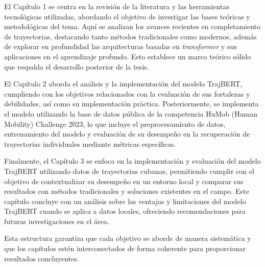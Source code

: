 El Capítulo 1 se centra en la revisión de la literatura y las herramientas tecnológicas utilizadas, abordando el objetivo de investigar las bases teóricas y metodológicas del tema. Aquí se analizan los avances recientes en completamiento de trayectorias, destacando tanto métodos tradicionales como modernos, además de explorar en profundidad las arquitecturas basadas en \textit{transformer} y sus aplicaciones en el aprendizaje profundo. Esto establece un marco teórico sólido que respalda el desarrollo posterior de la tesis.

El Capítulo 2 aborda el análisis y la implementación del modelo TrajBERT, cumpliendo con los objetivos relacionados con la evaluación de sus fortalezas y debilidades, así como su implementación práctica. Posteriormente, se implementa el modelo utilizando la base de datos pública de la competencia HuMob (Human Mobility) Challenge 2023, lo que incluye el preprocesamiento de datos, entrenamiento del modelo y evaluación de su desempeño en la recuperación de trayectorias individuales mediante métricas específicas.

Finalmente, el Capítulo 3 se enfoca en la implementación y evaluación del modelo TrajBERT utilizando datos de trayectorias cubanas, permitiendo cumplir con el objetivo de contextualizar su desempeño en un entorno local y comparar sus resultados con métodos tradicionales y soluciones existentes en el campo. Este capítulo concluye con un análisis sobre las ventajas y limitaciones del modelo TrajBERT cuando se aplica a datos locales, ofreciendo recomendaciones para futuras investigaciones en el área.

Esta estructura garantiza que cada objetivo se aborde de manera sistemática y que los capítulos estén interconectados de forma coherente para proporcionar resultados concluyentes. 